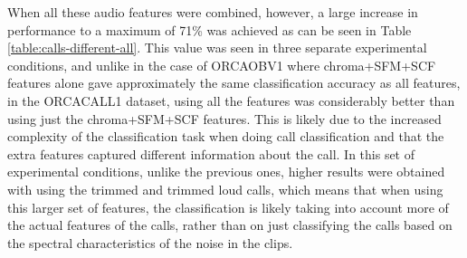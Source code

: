 \documentclass[12pt,oneside]{book}
\begin{document}
When all these audio features were combined, however, a large increase
in performance to a maximum of 71\% was achieved as can be seen in
Table \ref{table:calls-different-all}.  This value was seen in three
separate experimental conditions, and unlike in the case of ORCAOBV1
where chroma+SFM+SCF features alone gave approximately the same
classification accuracy as all features, in the ORCACALL1 dataset,
using all the features was considerably better than using just the
chroma+SFM+SCF features.  This is likely due to the increased
complexity of the classification task when doing call classification
and that the extra features captured different information about the
call.  In this set of experimental conditions, unlike the previous
ones, higher results were obtained with using the trimmed and trimmed
loud calls, which means that when using this larger set of features,
the classification is likely taking into account more of the actual
features of the calls, rather than on just classifying the calls based
on the spectral characteristics of the noise in the clips.
\end{document}

